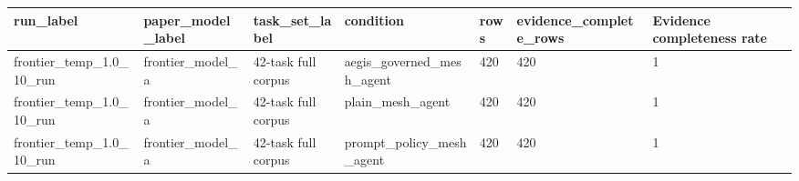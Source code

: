 \begin{tabular}{lllllll}
 \hline
run\_label & paper\_model\_label & task\_set\_label & condition & rows & evidence\_complete\_rows & Evidence completeness rate \\
 \hline
frontier\_temp\_1.0\_10\_run & frontier\_model\_a & 42-task full corpus & aegis\_governed\_mesh\_agent & 420 & 420 & 1 \\
frontier\_temp\_1.0\_10\_run & frontier\_model\_a & 42-task full corpus & plain\_mesh\_agent & 420 & 420 & 1 \\
frontier\_temp\_1.0\_10\_run & frontier\_model\_a & 42-task full corpus & prompt\_policy\_mesh\_agent & 420 & 420 & 1 \\
 \hline
\end{tabular}
